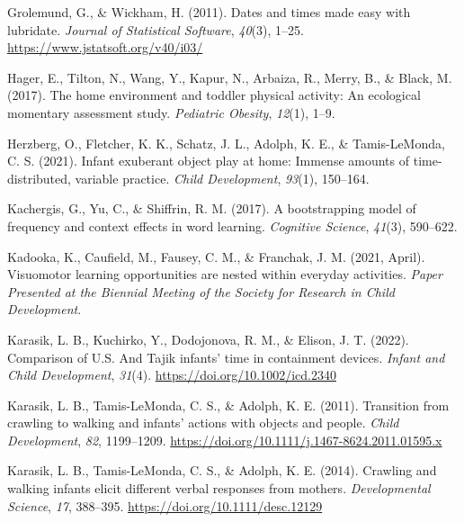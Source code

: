 \documentclass[
  man]{apa6}
\newlength{\cslhangindent}
\newlength{\cslentryspacingunit} %
\newenvironment{CSLReferences}[2] %
 {%
  \setlength{\parindent}{0pt}
  \ifodd #1
  \let\oldpar\par
  \def\par{\hangindent=\cslhangindent\oldpar}
  \fi
  \setlength{\parskip}{#2\cslentryspacingunit}
 }%
 {}
\begin{document}
\begin{CSLReferences}{1}{0}
\leavevmode{}%
Grolemund, G., \& Wickham, H. (2011). Dates and times made easy with {lubridate}. \emph{Journal of Statistical Software}, \emph{40}(3), 1--25. \url{https://www.jstatsoft.org/v40/i03/}

\leavevmode{}%
Hager, E., Tilton, N., Wang, Y., Kapur, N., Arbaiza, R., Merry, B., \& Black, M. (2017). The home environment and toddler physical activity: An ecological momentary assessment study. \emph{Pediatric Obesity}, \emph{12}(1), 1--9.

\leavevmode{}%
Herzberg, O., Fletcher, K. K., Schatz, J. L., Adolph, K. E., \& Tamis-LeMonda, C. S. (2021). Infant exuberant object play at home: Immense amounts of time-distributed, variable practice. \emph{Child Development}, \emph{93}(1), 150--164.

\leavevmode{}%
Kachergis, G., Yu, C., \& Shiffrin, R. M. (2017). A bootstrapping model of frequency and context effects in word learning. \emph{Cognitive Science}, \emph{41}(3), 590--622.

\leavevmode{}%
Kadooka, K., Caufield, M., Fausey, C. M., \& Franchak, J. M. (2021, April). Visuomotor learning opportunities are nested within everyday activities. \emph{Paper Presented at the Biennial Meeting of the Society for Research in Child Development}.

\leavevmode{}%
Karasik, L. B., Kuchirko, Y., Dodojonova, R. M., \& Elison, J. T. (2022). Comparison of {U.S.} And {Tajik} infants' time in containment devices. \emph{Infant and Child Development}, \emph{31}(4). \url{https://doi.org/10.1002/icd.2340}

\leavevmode{}%
Karasik, L. B., Tamis-LeMonda, C. S., \& Adolph, K. E. (2011). Transition from crawling to walking and infants' actions with objects and people. \emph{Child Development}, \emph{82}, 1199--1209. \url{https://doi.org/10.1111/j.1467-8624.2011.01595.x}

\leavevmode{}%
Karasik, L. B., Tamis-LeMonda, C. S., \& Adolph, K. E. (2014). Crawling and walking infants elicit different verbal responses from mothers. \emph{Developmental Science}, \emph{17}, 388--395. \url{https://doi.org/10.1111/desc.12129}


\end{CSLReferences}
\end{document}
